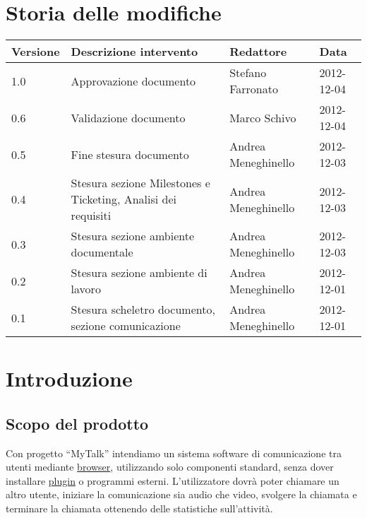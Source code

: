 \section*{Storia delle modifiche}
\begin{tabularx}{\textwidth}{lXll}
\toprule
Versione & Descrizione intervento & Redattore & Data\\
\midrule %
1.0 & Approvazione documento & Stefano Farronato & 2012-12-04\\
0.6 & Validazione documento & Marco Schivo & 2012-12-04\\
0.5 & Fine stesura documento & Andrea Meneghinello & 2012-12-03\\
0.4 & Stesura sezione Milestones e Ticketing, Analisi dei requisiti & Andrea Meneghinello & 2012-12-03\\
0.3 & Stesura sezione ambiente documentale & Andrea Meneghinello & 2012-12-03\\
0.2 & Stesura sezione ambiente di lavoro & Andrea Meneghinello & 2012-12-01\\
0.1 & Stesura scheletro documento, sezione comunicazione & Andrea Meneghinello & 2012-12-01\\
\bottomrule
\end{tabularx}
\newpage



\setcounter{page}{1}
\pagestyle{normal}

\newpage
\section{Introduzione}
\subsection{Scopo del prodotto}
Con progetto ``MyTalk'' intendiamo un sistema software di comunicazione tra utenti mediante \underline{browser}, utilizzando solo componenti standard, senza dover installare \underline{plugin} o programmi esterni. L'utilizzatore dovrà poter chiamare un altro utente, iniziare la comunicazione sia audio che video, svolgere la chiamata e terminare la chiamata ottenendo delle statistiche sull'attività.

